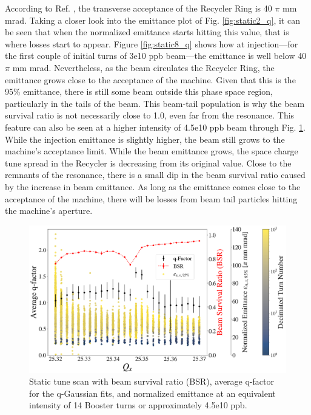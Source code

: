 According to Ref. \cite{rr0}, the transverse acceptance of the Recycler Ring is 40 $\pi$ mm mrad. Taking a closer look into the emittance plot of Fig. \ref{fig:static2_q}, it can be seen that when the normalized emittance starts hitting this value, that is where losses start to appear. Figure \ref{fig:static8_q} shows how at injection---for the first couple of initial turns of 3e10 ppb beam---the emittance is well below 40 $\pi$ mm mrad. Nevertheless, as the beam circulates the Recycler Ring, the emittance grows close to the acceptance of the machine. Given that this is the 95\% emittance, there is still some beam outside this phase space region, particularly in the tails of the beam. This beam-tail population is why the beam survival ratio is not necessarily close to 1.0, even far from the resonance. This feature can also be seen at a higher intensity of 4.5e10 ppb beam through Fig. \ref{fig:static14_q}. While the injection emittance is slightly higher, the beam still grows to the machine's acceptance limit. While the beam emittance grows, the space charge tune spread in the Recycler is decreasing from its original value. Close to the remnants of the resonance, there is a small dip in the beam survival ratio caused by the increase in beam emittance. As long as the emittance comes close to the acceptance of the machine, there will be losses from beam tail particles hitting the machine's aperture. 

\begin{figure}[H]
    \centering
    \includegraphics[width=\columnwidth]{chapter6/static14turns_emittance_dampersOFF.png}
    \caption{Static tune scan with beam survival ratio (BSR), average q-factor for the q-Gaussian fits, and normalized emittance at an equivalent intensity of 14 Booster turns or approximately 4.5e10 ppb.}
    \label{fig:static14_q}
\end{figure}

